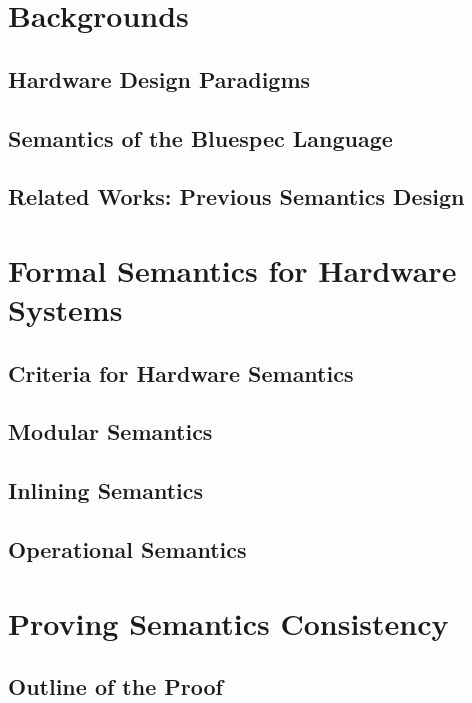 \documentclass[12pt,twoside]{mitthesis}
\begin{document}

\pagestyle{plain}





\chapter{Backgrounds}

\section{Hardware Design Paradigms}
\section{Semantics of the Bluespec Language}
\section{Related Works: Previous Semantics Design}

\chapter{Formal Semantics for Hardware Systems}

\section{Criteria for Hardware Semantics} %
\section{Modular Semantics}
\section{Inlining Semantics}
\section{Operational Semantics}

\chapter{Proving Semantics Consistency}

\section{Outline of the Proof} %
\end{document}
